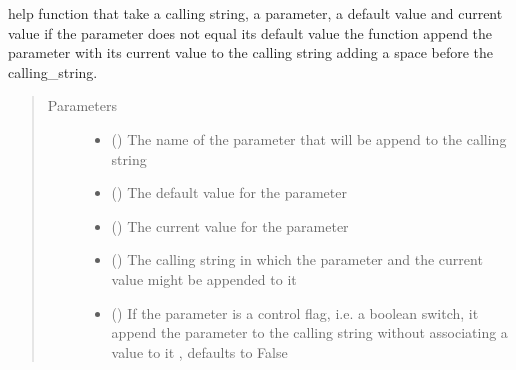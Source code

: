 \documentclass[letterpaper,10pt,english]{sphinxmanual}
\begin{document}
\begin{fulllineitems}
\label{\detokenize{IPTK.Utils:IPTK.Utils.UtilityFunction.append_to_calling_string}}
help function that take a calling string, a parameter, a default value and current value     if the parameter does not equal its default value the function append the parameter with its current 
value to the calling string adding a space before the calling\_string.
\begin{quote}\begin{description}
\item[{Parameters}] \leavevmode\begin{itemize}
\item {} 
 () \textendash{} The name of the parameter that will be append to the calling string

\item {} 
 (\sphinxstyleliteralemphasis{\sphinxupquote{{[}}}\sphinxstyleliteralemphasis{\sphinxupquote{{]}}}) \textendash{} The default value for the parameter

\item {} 
 (\sphinxstyleliteralemphasis{\sphinxupquote{{[}}}\sphinxstyleliteralemphasis{\sphinxupquote{{]}}}) \textendash{} The current value for the parameter

\item {} 
 () \textendash{} The calling string in which the parameter and the current value might be appended to it

\item {} 
 (\sphinxstyleliteralemphasis{\sphinxupquote{, }}) \textendash{} If the parameter is a control flag, i.e. a boolean switch, it append the parameter to the calling string without associating a value to it , defaults to False


\end{itemize}
\end{description}
\end{quote}
\end{fulllineitems}
\end{document}
